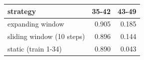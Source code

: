 \begin{tabular}{lrr}
\toprule
strategy & 35-42 & 43-49 \\
\midrule
expanding window & 0.905 & 0.185 \\
sliding window (10 steps) & 0.896 & 0.144 \\
static (train 1-34) & 0.890 & 0.043 \\
\bottomrule
\end{tabular}
